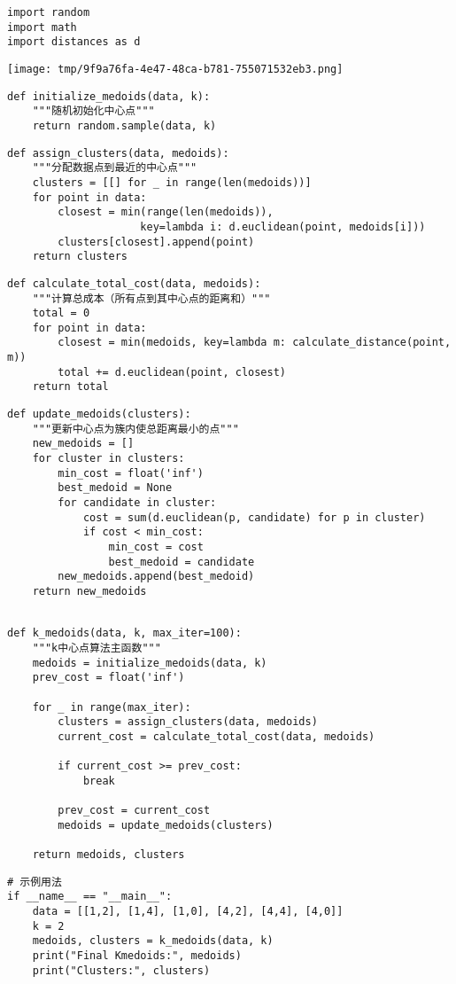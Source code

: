 \begin{verbatim}
import random
import math
import distances as d 
\end{verbatim}

\begin{center}
\texttt{[image: tmp/9f9a76fa-4e47-48ca-b781-755071532eb3.png]}
\end{center}




\begin{verbatim}
def initialize_medoids(data, k):
    """随机初始化中心点"""
    return random.sample(data, k)
\end{verbatim}


\begin{verbatim}
def assign_clusters(data, medoids):
    """分配数据点到最近的中心点"""
    clusters = [[] for _ in range(len(medoids))]
    for point in data:
        closest = min(range(len(medoids)), 
                     key=lambda i: d.euclidean(point, medoids[i]))
        clusters[closest].append(point)
    return clusters
\end{verbatim}



\begin{verbatim}
def calculate_total_cost(data, medoids):
    """计算总成本（所有点到其中心点的距离和）"""
    total = 0
    for point in data:
        closest = min(medoids, key=lambda m: calculate_distance(point, m))
        total += d.euclidean(point, closest)
    return total
\end{verbatim}

\begin{verbatim}
def update_medoids(clusters):
    """更新中心点为簇内使总距离最小的点"""
    new_medoids = []
    for cluster in clusters:
        min_cost = float('inf')
        best_medoid = None
        for candidate in cluster:
            cost = sum(d.euclidean(p, candidate) for p in cluster)
            if cost < min_cost:
                min_cost = cost
                best_medoid = candidate
        new_medoids.append(best_medoid)
    return new_medoids


\end{verbatim}

\begin{verbatim}
def k_medoids(data, k, max_iter=100):
    """k中心点算法主函数"""
    medoids = initialize_medoids(data, k)
    prev_cost = float('inf')

    for _ in range(max_iter):
        clusters = assign_clusters(data, medoids)
        current_cost = calculate_total_cost(data, medoids)

        if current_cost >= prev_cost:
            break

        prev_cost = current_cost
        medoids = update_medoids(clusters)

    return medoids, clusters

\end{verbatim}



\begin{verbatim}
# 示例用法
if __name__ == "__main__":
    data = [[1,2], [1,4], [1,0], [4,2], [4,4], [4,0]]
    k = 2
    medoids, clusters = k_medoids(data, k)
    print("Final Kmedoids:", medoids)
    print("Clusters:", clusters)


\end{verbatim}
